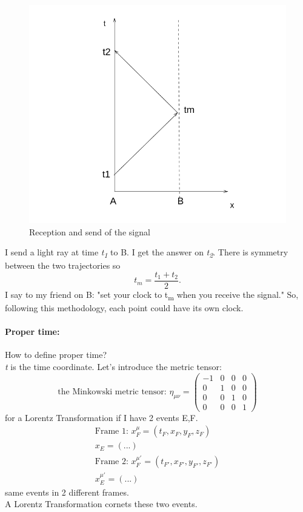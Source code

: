 \documentclass{report}
\begin{document}
\begin{figure}
\centering
\includegraphics[width=\linewidth]{imm/segnale.png}
\caption{Reception and send of the signal}
\label{imm:segnale.png}
\end{figure}

I send a light ray at time \emph{t\textsubscript{1}} to B. I get the answer on \emph{t\textsubscript{2}}. There is symmetry between the two trajectories so \[
t_{m} = \frac{ t_{1} + t_{2} }{2}. 
\]
I say to my friend on B: "set your clock to t\textsubscript{m} when you receive the signal."
So, following this methodology, each point could have its own clock.

\paragraph{Proper time:} How to define proper time? \\
\emph{t} is the time coordinate. Let's introduce the metric tensor:
\begin{equation}
	\text{the Minkowski metric tensor: } \eta_{\mu \nu } = \begin{pmatrix}
	-1 & 0 & 0 & 0 \\
	0 & 1 & 0 & 0 \\
	0 & 0 & 1 & 0 \\
	0 & 0 & 0 & 1
	\end{pmatrix} 		
\end{equation}
for a Lorentz Transformation if I have 2 events E,F.
\begin{gather*}
	\text{Frame 1: } x_{F}^{\mu } = \left( t_{F}, x_{F}, y_{F}, z_{F} \right)\\
	x_{E} = \left( ... \right) \\
	\text{Frame 2: } x_{F}^{\mu' } = \left( t_{F'}, x_{F'}, y_{F'}, z_{F'} \right) \\
	x_{E}^{\mu' } = \left( ... \right)	 
\end{gather*}
same events in 2 different frames. \\
A Lorentz Transformation cornets these two events.
\end{document}
